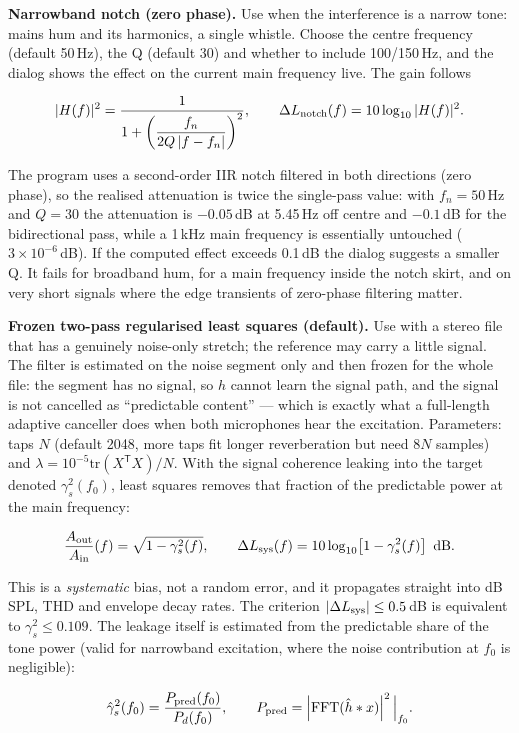 \documentclass[UTF8,a4paper,12pt]{ctexart}
\begin{document}
\textbf{Narrowband notch (zero phase).} Use when the interference is a narrow tone: mains hum and its harmonics, a single whistle. Choose the centre frequency (default 50\,Hz), the Q (default 30) and whether to include 100/150\,Hz, and the dialog shows the effect on the current main frequency live. The gain follows

\[
|H(f)|^{2}=\frac{1}{1+\left(\dfrac{f_n}{2Q\,|f-f_n|}\right)^{2}},
\qquad
\Delta L_{\rm notch}(f)=10\log_{10}|H(f)|^{2}.
\]

The program uses a second-order IIR notch filtered in both directions (zero phase), so the realised attenuation is twice the single-pass value: with $f_n=50$\,Hz and $Q=30$ the attenuation is $-0.05$\,dB at 5.45\,Hz off centre and $-0.1$\,dB for the bidirectional pass, while a 1\,kHz main frequency is essentially untouched ($3\times10^{-6}$\,dB). If the computed effect exceeds 0.1\,dB the dialog suggests a smaller Q. It fails for broadband hum, for a main frequency inside the notch skirt, and on very short signals where the edge transients of zero-phase filtering matter.

\textbf{Frozen two-pass regularised least squares (default).} Use with a stereo file that has a genuinely noise-only stretch; the reference may carry a little signal. The filter is estimated on the noise segment only and then frozen for the whole file: the segment has no signal, so $h$ cannot learn the signal path, and the signal is not cancelled as ``predictable content'' --- which is exactly what a full-length adaptive canceller does when both microphones hear the excitation. Parameters: taps $N$ (default 2048, more taps fit longer reverberation but need $8N$ samples) and $\lambda=10^{-5}\mathrm{tr}(X^{\mathsf T}X)/N$. With the signal coherence leaking into the target denoted $\gamma_s^2(f_0)$, least squares removes that fraction of the predictable power at the main frequency:

\[
\frac{A_{\rm out}}{A_{\rm in}}(f)=\sqrt{1-\gamma_s^{2}(f)},
\qquad
\Delta L_{\rm sys}(f)=10\log_{10}\!\left[1-\gamma_s^{2}(f)\right]\ {\rm dB}.
\]

This is a \emph{systematic} bias, not a random error, and it propagates straight into dB SPL, THD and envelope decay rates. The criterion $|\Delta L_{\rm sys}|\le 0.5$\,dB is equivalent to $\gamma_s^2\le 0.109$. The leakage itself is estimated from the predictable share of the tone power (valid for narrowband excitation, where the noise contribution at $f_0$ is negligible):

\[
\hat\gamma_s^{2}(f_0)=\frac{P_{\rm pred}(f_0)}{P_d(f_0)},
\qquad
P_{\rm pred}=\left|{\rm FFT}(\hat h * x)\right|^{2}\Big|_{f_0}.
\]
\end{document}
